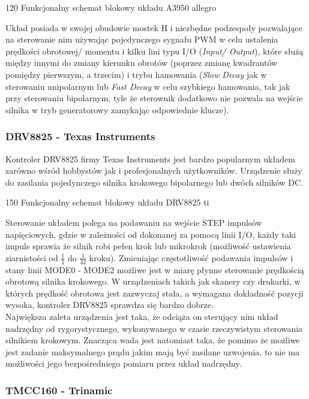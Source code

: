 	{120}
	{Funkcjonalny schemat blokowy układu A3950}
	{allegro}

Układ posiada w swojej obudowie mostek H i niezbędne podzespoły pozwalające na sterowanie nim używając pojedynczego sygnału PWM w celu ustalenia prędkości obrotowej/ momentu i kilku lini typu I/O ({\it Input/ Output}), które służą między innymi do zmiany kierunku obrotów (poprzez zmianę kwadrantów pomiędzy pierwszym, a trzecim) i trybu hamowania ({\it Slow Decay} jak w sterowaniu unipolarnym lub {\it Fast Decay} w celu szybkiego hamowania, tak jak przy sterowaniu bipolarnym, tyle że sterownik dodatkowo nie pozwala na wejście silnika w tryb generatorowy zamykając odpowiednie klucze). 

\subsubsection{DRV8825 - Texas Instruments}

Kontroler DRV8825 firmy Texas Instruments jest bardzo popularnym układem zarówno wśród hobbystów jak i profesjonalnych użytkowników. Urządzenie służy do  zasilania pojedynczego silnika krokowego bipolarnego lub dwóch silników DC.

	{150}
	{Funkcjonalny schemat blokowy układu DRV8825}
	{ti}

Sterowanie układem polega na podawaniu na wejście STEP impulsów napięciowych, gdzie w zależności od dokonanej za pomocą linii I/O, każdy taki impuls sprawia że silnik robi pełen krok lub mikrokrok (możliwość ustawienia ziarnistości od $ \frac{1}{2} $ do $ \frac{1}{32} $ kroku). Zmieniając częstotliwość podawania impulsów i stany linii MODE0 - MODE2 możliwe jest w miarę płynne sterowanie prędkością obrotową silnika krokowego. W urządzeniach takich jak skanery czy drukarki, w których prędkość obrotowa jest zazwyczaj stała, a wymagana dokładność pozycji wysoka, kontroler DRV8825 sprawdza się bardzo dobrze. \\

Największa zaleta urządzenia jest taka, że odciąża on sterujący nim układ nadrzędny od rygorystycznego, wykonywanego w czasie rzeczywistym sterowania silnikiem krokowym. Znacząca wada jest natomiast taka, że pomimo że możliwe jest zadanie maksymalnego prądu jakim mają być zasilane uzwojenia, to nie ma możliwości jego bezpośredniego pomiaru przez układ nadrzędny.

\subsubsection{TMCC160 - Trinamic}

